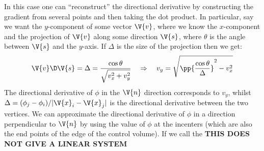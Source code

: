 \documentclass[sigconf]{acmart}
\begin{document}
In this case one can ``reconstruct'' the directional derivative by constructing the gradient from several points and then taking the dot product. In particular, say we want the $ y $-component of some vector $ \V{v} $, where we know the $ x $-component and the projection of $ \V{v} $ along some direction $ \V{s} $, where $ \theta $ is the angle between $ \V{s} $ and the $ y $-axis. If $ \Delta $ is the size of the projection then we get:
\begin{equation}\label{key}
	\V{v} \D \V{s} = \Delta = \frac{\cos \theta}{\sqrt{v_x^2 + v_y^2}} \quad \Rightarrow \quad v_y = \sqrt{\pp{\frac{\cos \theta}{\Delta}}^2 - v_x^2}
\end{equation}
The directional derivative of $ \phi $ in the $ \V{n} $ direction corresponds to $ v_y $, whilst $ \Delta = (\phi_j-\phi_i)/|\V{x}_i-\V{x}_j| $ is the directional derivative between the two vertices. We can approximate the directional derivative of $ \phi $ in a direction perpendicular to $ \V{n} $ by using the value of $ \phi $ at the incenters (which are also the end points of the edge of the control volume). If we call the \textbf{THIS DOES NOT GIVE A LINEAR SYSTEM}
\end{document}
